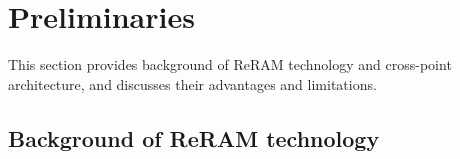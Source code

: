 \vspace{10pt}
\section{Preliminaries}\label{sec:preliminary}

This section provides background of ReRAM technology and cross-point
architecture, and discusses their advantages and limitations.

\subsection{Background of ReRAM technology}
%

